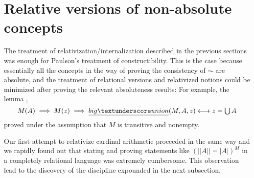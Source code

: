 \section{Relative versions of non-absolute concepts}
\label{sec:relat-vers-non-absol}

The treatment of relativization/internalization described in the
previous sections was enough for Paulson's treatment of
constructibility. This is the case because essentially all the
concepts in the way of proving the consistency of $\AC$ are
absolute, and the treatment of relational versions and relativized notions
could be minimized after proving the relevant absoluteness results:
For example, the lemma ,
\[
  M(A) \implies M(z) \implies \isa{big{\uscore}union}(M, A, z) \longleftrightarrow z = \union
  A
\]
proved under the assumption that $M$ is transitive and nonempty.

Our first attempt to relativize cardinal arithmetic proceeded in the
same way
and we rapidly found out that stating and proving statements like $(||A||
= |A|) ^M$ in a completely relational language was extremely
cumbersome. This observation lead to the discovery of the discipline
expounded in the next subsection.


